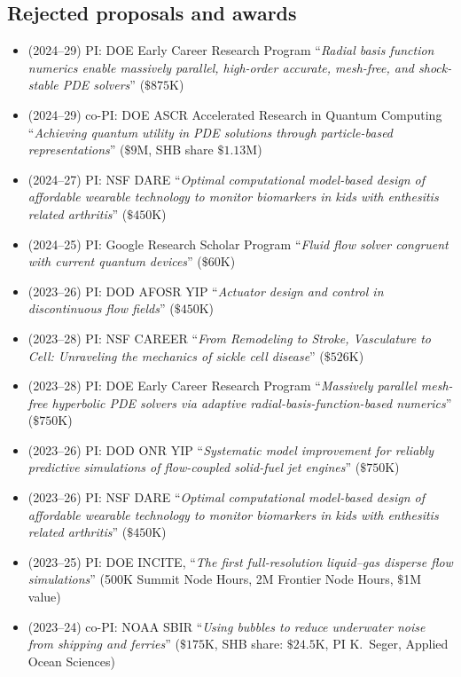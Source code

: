 \subsection{Rejected proposals and awards}

\begin{itemize}
    \item (2024--29) PI: DOE Early Career Research Program ``\textit{Radial basis function numerics enable massively parallel, high-order accurate, mesh-free, and shock-stable PDE solvers}'' ($\$875$K)
    \item (2024--29) co-PI: DOE ASCR Accelerated Research in Quantum Computing ``\textit{Achieving quantum utility in PDE solutions through particle-based representations}'' ($\$9$M, SHB share $\$1.13$M)
    \item (2024--27) PI: NSF DARE ``\textit{Optimal computational model-based design of affordable wearable technology to monitor biomarkers in kids with enthesitis related arthritis}'' ($\$450$K)
    \item (2024--25) PI: Google Research Scholar Program ``\textit{Fluid flow solver congruent with current quantum devices}'' ($\$60$K)
    \item (2023--26) PI: DOD AFOSR YIP ``\textit{Actuator design and control in discontinuous flow fields}'' ($\$450$K)
    \item (2023--28) PI: NSF CAREER ``\textit{From Remodeling to Stroke, Vasculature to Cell: Unraveling the mechanics of sickle cell disease}'' ($\$526$K)
    \item (2023--28) PI: DOE Early Career Research Program ``\textit{Massively parallel mesh-free hyperbolic PDE solvers via adaptive radial-basis-function-based numerics}'' ($\$750$K)
    \item (2023--26) PI: DOD ONR YIP ``\textit{Systematic model improvement for reliably predictive simulations of flow-coupled solid-fuel jet engines}'' ($\$750$K)
    \item (2023--26) PI: NSF DARE ``\textit{Optimal computational model-based design of affordable wearable technology to monitor biomarkers in kids with enthesitis related arthritis}'' ($\$450$K)
    \item (2023--25) PI: DOE INCITE, ``\textit{The first full-resolution liquid--gas disperse flow simulations}'' (500K Summit Node Hours, 2M Frontier Node Hours, $\$$1M value)
    \item (2023--24) co-PI: NOAA SBIR ``\textit{Using bubbles to reduce underwater noise from shipping and ferries}'' ($\$175$K, SHB share: $\$24.5$K, PI K.\ Seger, Applied Ocean Sciences)

\end{itemize}
